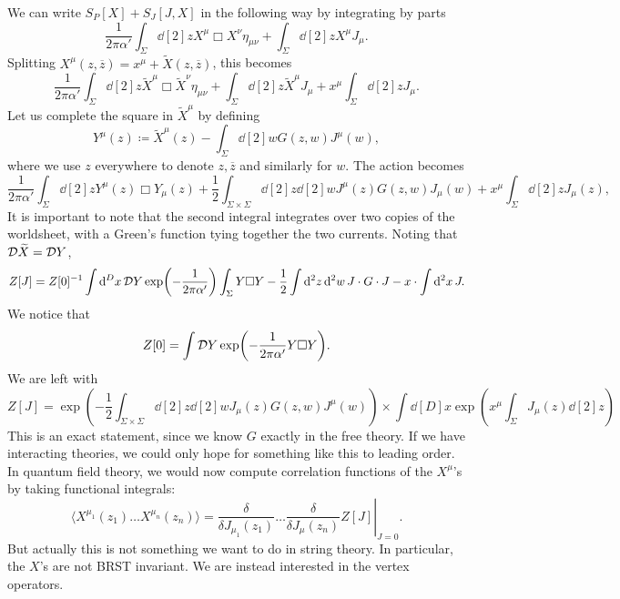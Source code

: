 We can write $S_P[X] + S_J[J, X]$ in the following way by integrating by parts
\begin{equation}
  \frac{1}{2\pi \alpha'} \int_{\Sigma} \dd[2]{z} X^{\mu} \Box X^{\nu} \eta_{\mu\nu} +  \int_{\Sigma} \dd[2]{z} X^{\mu} J_{\mu}.
\end{equation}
Splitting $X^{\mu}(z, \overline{z}{}) = x^{\mu} + \widetilde{X}(z, \overline{z}{})$, this becomes
\begin{equation}
  \frac{1}{2\pi \alpha'} \int_{\Sigma} \dd[2]{z} \widetilde{X}^{\mu} \Box \widetilde{X}^{\nu} \eta_{\mu\nu} +  \int_{\Sigma} \dd[2]{z} \widetilde{X}^{\mu} J_{\mu} + x^{\mu} \int_{\Sigma} \dd[2]{z} J_{\mu}.
\end{equation}
Let us complete the square in $\widetilde{X}^{\mu}$ by defining
\begin{equation}
  Y^{\mu}(z) \coloneqq \widetilde{X}^{\mu}(z) - \int_{\Sigma} \dd[2]{w} G(z, w) J^{\mu}(w),
\end{equation}
where we use $z$ everywhere to denote $z, \overline{z}{}$ and similarly for $w$. The action becomes
\begin{equation}
  \frac{1}{2\pi \alpha'} \int_{\Sigma} \dd[2]{z} Y^{\mu}(z) \Box Y_{\mu}(z) + \frac{1}{2} \int_{\Sigma \times \Sigma} \dd[2]{z} \dd[2]{w} J^{\mu}(z) G(z, w) J_{\mu}(w) + x^{\mu} \int_{\Sigma} \dd[2]{z} J_{\mu}(z),
\end{equation}
It is important to note that the second integral integrates over two copies of the worldsheet, with a Green's function tying together the two currents.
Noting that $\mathop{\mathcal{D} \widetilde{X}} = \mathop{\mathcal{D} Y}$, 
\begin{equation}
  Z[J] = Z[0]^{-1} \int \dd[D]{x} \mathop{\mathcal{D} Y} \exp(-\frac{1}{2\pi \alpha'}) \int_{\Sigma} Y \Box Y - \frac{1}{2} \int \dd[2]{z} \dd[2]{w} J \cdot G \cdot J - x \cdot \int \dd[2]{x} J.
\end{equation}
We notice that
\begin{equation}
  Z[0] = \int \mathop{\mathcal{D} Y} \exp(-\frac{1}{2 \pi \alpha'} Y \Box Y).
\end{equation}
We are left with
\begin{equation}
  \label{eq:22-z}
  \boxed{Z[J] = \exp(-\frac{1}{2} \int_{\Sigma \times \Sigma} \dd[2]{z} \dd[2]{w} J_{\mu}(z) G(z, w) J^{\mu}(w)) \times \int \dd[D]{x} \exp(x^{\mu} \int_\Sigma J_{\mu}(z) \dd[2]{z})}
\end{equation}
This is an exact statement, since we know $G$ exactly in the free theory.
If we have interacting theories, we could only hope for something like this to leading order.
In quantum field theory, we would now compute correlation functions of the $X^{\mu}$'s by taking functional integrals:
\begin{equation}
\langle X^{\mu_1} (z_1)\dots X^{\mu_n}(z_n) \rangle = \left.\frac{\delta }{\delta J_{\mu_1}(z_1)} \dots \frac{\delta }{\delta J_{\mu}(z_n)} Z[J] \right\rvert_{J = 0}.
\end{equation}
But actually this is not something we want to do in string theory. In particular, the $X$'s are not BRST invariant. We are instead interested in the vertex operators.

